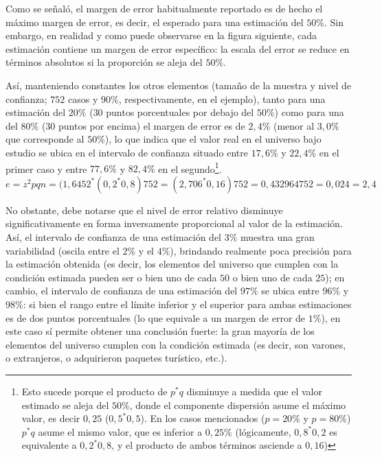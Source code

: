\documentclass[
]{book}
\begin{document}
Como se señaló, el margen de error habitualmente reportado es de hecho el máximo margen de error, es decir, el esperado para una estimación del \(50\%\). Sin embargo, en realidad y como puede observarse en la figura siguiente, cada estimación contiene un margen de error específico: la escala del error se reduce en términos absolutos si la proporción se aleja del \(50\%\).

Así, manteniendo constantes los otros elementos (tamaño de la muestra y nivel de confianza; \(752\) casos y \(90\%\), respectivamente, en el ejemplo), tanto para una estimación del \(20\%\) (\(30\) puntos porcentuales por debajo del \(50\%\)) como para una del \(80\%\) (\(30\) puntos por encima) el margen de error es de \(2,4\%\) (menor al \(3,0\%\) que corresponde al \(50\%\)), lo que indica que el valor real en el universo bajo estudio se ubica en el intervalo de confianza situado entre \(17,6\%\) y \(22,4\%\) en el primer caso y entre \(77,6\%\) y \(82,4\%\) en el segundo\footnote{Esto sucede porque el producto de \(p^*q\) disminuye a medida que el valor estimado se aleja del \(50\%\), donde el componente dispersión asume el máximo valor, es decir \(0,25\) (\(0,5^*0,5\)). En los casos mencionados (\(p=20\%\) y \(p=80\%\)) \(p^*q\) asume el mismo valor, que es inferior a \(0,25\%\) (lógicamente, \(0,8^*0,2\) es equivalente a \(0,2^*0,8\), y el producto de ambos términos asciende a \(0,16\))}.\\

\[e = z ^2 pqn = (1,6452 ^* (0,2 ^* 0,8)752 = (2,706 ^* 0,16)752 = 0,432964752 = 0,024 = 2,4%
\]

No obstante, debe notarse que el nivel de error relativo disminuye significativamente en forma inversamente proporcional al valor de la estimación. Así, el intervalo de confianza de una estimación del \(3\%\) muestra una gran variabilidad (oscila entre el \(2\%\) y el \(4\%\)), brindando realmente poca precisión para la estimación obtenida (es decir, los elementos del universo que cumplen con la condición estimada pueden ser o bien uno de cada \(50\) o bien uno de cada \(25\)); en cambio, el intervalo de confianza de una estimación del \(97\%\) se ubica entre \(96\%\) y \(98\%\): si bien el rango entre el límite inferior y el superior para ambas estimaciones es de dos puntos porcentuales (lo que equivale a un margen de error de \(1\%\)), en este caso sí permite obtener una conclusión fuerte: la gran mayoría de los elementos del universo cumplen con la condición estimada (es decir, son varones, o extranjeros, o adquirieron paquetes turístico, etc.).
\end{document}
